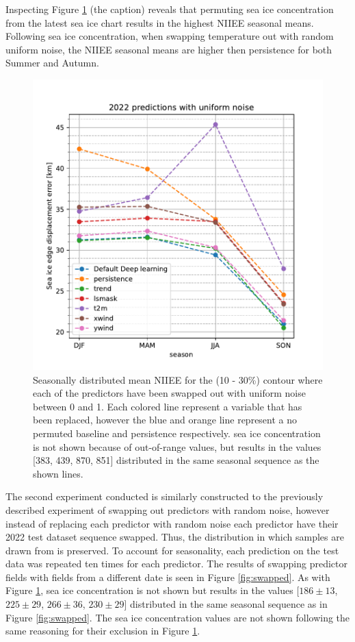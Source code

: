 \documentclass[../main/thesis.tex]{subfiles}
\begin{document}
Inspecting Figure \ref{fig:noisy} (the caption) reveals that permuting sea ice concentration from the latest sea ice chart results in the highest NIIEE seasonal means. Following sea ice concentration, when swapping temperature out with random uniform noise, the NIIEE seasonal means are higher then persistence for both Summer and Autumn. 

\begin{figure}
    \centering
    \includegraphics[width=\textwidth]{noisy.pdf}
    \caption{\label{fig:noisy}Seasonally distributed mean NIIEE for the (10 - 30\%) contour where each of the predictors have been swapped out with uniform noise between 0 and 1. Each colored line represent a variable that has been replaced, however the blue and orange line represent a no permuted baseline and persistence respectively. sea ice concentration is not shown because of out-of-range values, but results in the values [383, 439, 870, 851] distributed in the same seasonal sequence as the shown lines.}
\end{figure}

The second experiment conducted is similarly constructed to the previously described experiment of swapping out predictors with random noise, however instead of replacing each predictor with random noise each predictor have their 2022 test dataset sequence swapped. Thus, the distribution in which samples are drawn from is preserved. To account for seasonality, each prediction on the test data was repeated ten times for each predictor. The results of swapping predictor fields with fields from a different date is seen in Figure \ref{fig:swapped}. As with Figure \ref{fig:noisy}, sea ice concentration is not shown but results in the values [$186 \pm 13$, $225 \pm 29$, $266 \pm 36$, $230 \pm 29$] distributed in the same seasonal sequence as in Figure \ref{fig:swapped}. The sea ice concentration values are not shown following the same reasoning for their exclusion in Figure \ref{fig:noisy}.
\end{document}
